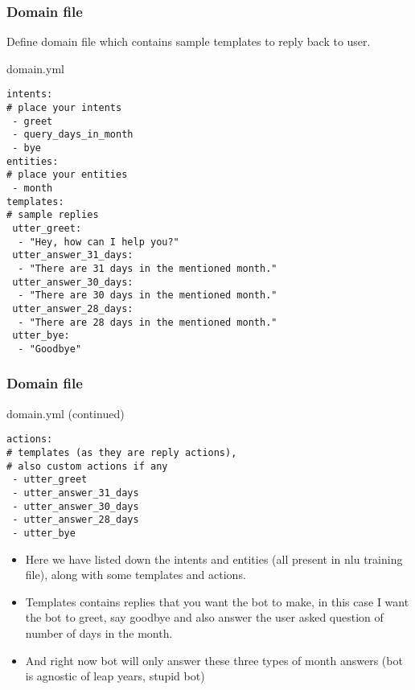 





 \begin{frame}[fragile]\frametitle{Domain file}
Define domain file which contains sample templates to reply back to user.

domain.yml
\begin{lstlisting}
intents:
# place your intents
 - greet
 - query_days_in_month
 - bye
entities:
# place your entities
 - month
templates:
# sample replies
 utter_greet:
  - "Hey, how can I help you?"
 utter_answer_31_days:
  - "There are 31 days in the mentioned month."
 utter_answer_30_days:
  - "There are 30 days in the mentioned month."
 utter_answer_28_days:
  - "There are 28 days in the mentioned month."
 utter_bye:
  - "Goodbye"
\end{lstlisting}
\end{frame}

 \begin{frame}[fragile]\frametitle{Domain file}
domain.yml (continued)
\begin{lstlisting}
actions:
# templates (as they are reply actions),
# also custom actions if any
 - utter_greet
 - utter_answer_31_days
 - utter_answer_30_days
 - utter_answer_28_days
 - utter_bye
\end{lstlisting}

\begin{itemize}
\item Here we have listed down the intents and entities (all present in nlu training file), along with some templates and actions. 
\item Templates contains replies that you want the bot to make, in this case I want the bot to greet, say goodbye and also answer the user asked question of number of days in the month. 
\item And right now bot will only answer these three types of month answers (bot is agnostic of leap years, stupid bot)
\end{itemize}
\end{frame}


